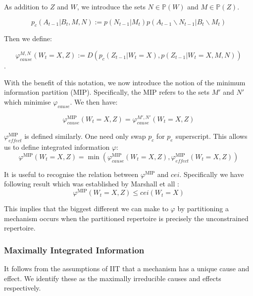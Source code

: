 As addition to $Z$ and $W$, we introduce the sets $N \in \mathbb{P}(W)$ and $M \in \mathbb{P}(Z)$.

\begin{equation}
\label{def:preMIP}
p_c(A_{t-1}|B_t ,M, N):= p(N_{t-1}|M_t) p(A_{t-1} \backslash N_{t-1} |B_t \backslash M_t)
\end{equation}

Then we define:

\begin{equation}
\label{def:phi2}
\varphi_{cause}^{M,N}(W_t=X, Z) := D \left( p_c(Z_{t-1}|W_t=X) ,p(Z_{t-1}|W_{t} = X,M,N)  \right)
\end{equation}.

With the benefit of this notation, we now introduce the notion of the minimum information partition (MIP). Specifically, the MIP refers to the sets $M'$ and $N'$ which minimise $\varphi_{cause}$. We then have:

\begin{equation}
\label{def:phi3}
\varphi_{cause}^{\text{MIP}}(W_t=X, Z)  = \varphi_{cause}^{M',N'}(W_t=X, Z) 
\end{equation}

$\varphi^{\text{MIP}}_{effect}$ is defined similarly. One need only swap $p_c$ for $p_e$ superscript. This allows us to define integrated information $\varphi$:
\begin{equation}
\label{def:phi}
\varphi^{\text{MIP}}(W_t=X, Z) = \min \left( \varphi_{cause}^{\text{MIP}}(W_t=X, Z), \varphi_{effect}^{\text{MIP}}(W_t=X, Z)  \right) 
\end{equation}



It is useful to recognise the relation between $\varphi^{\text{MIP}}$ and $cei$. Specifically we have following result which was established by Marshall et all \cite{marshall2016integrated}:
\begin{equation}
\label{eq:bound_phi_cei}
\varphi^{\text{MIP}}(W_t=X, Z) \leq cei(W_t=X) 
\end{equation}

This implies that the biggest different we can make to $\varphi$ by partitioning a mechanism occurs when the partitioned repertoire is precisely the unconstrained repertoire. 



\subsubsection{Maximally Integrated Information}
It follows from the assumptions of IIT that a mechanism has a unique cause and effect. We identify these as the maximally irreducible causes and effects respectively. 

